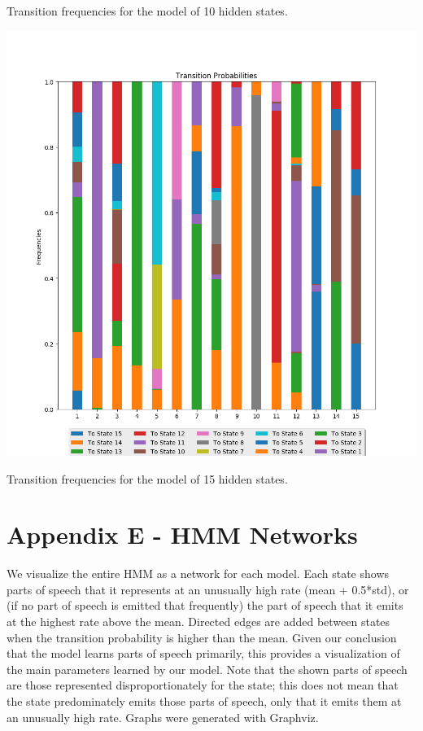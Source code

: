 Transition frequencies for the model of 10 hidden states.

\begin{center}
\includegraphics[scale=0.6]{../src/results/transitions_15}
\end{center}

Transition frequencies for the model of 15 hidden states.

\pagebreak
\section{Appendix E - HMM Networks}
We visualize the entire HMM as a network for each model. Each state shows parts of speech that it represents at an unusually high rate (mean + 0.5*std), or (if no part of speech is emitted that frequently) the part of speech that it emits at the highest rate above the mean. Directed edges are added between states when the transition probability is higher than the mean. Given our conclusion that the model learns parts of speech primarily, this provides a visualization of the main parameters learned by our model. Note that the shown parts of speech are those represented disproportionately for the state; this does not mean that the state predominately emits those parts of speech, only that it emits them at an unusually high rate. Graphs were generated with Graphviz.

